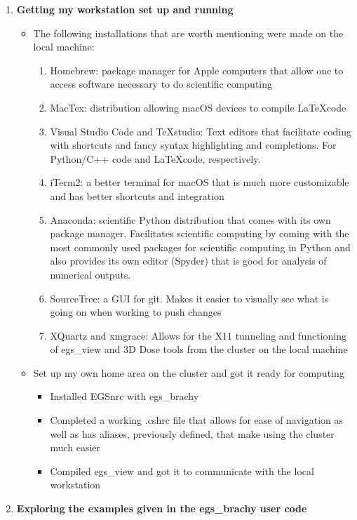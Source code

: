 \documentclass[12pt]{article}
\begin{document}
\begin{enumerate}
	\item \textbf{Getting my workstation set up and running}
	\begin{itemize}
		\item The following installations that are worth mentioning were made on the local machine:
		\begin{enumerate}
			\item Homebrew: package manager for Apple computers that allow one to access software necessary to do scientific computing
			\item MacTex: distribution allowing macOS devices to compile \LaTeX code
			\item Visual Studio Code and TeXstudio: Text editors that facilitate coding with shortcuts and fancy syntax highlighting and completions. For Python/C++ code and \LaTeX code, respectively.
			\item iTerm2: a better terminal for macOS that is much more customizable and has better shortcuts and integration
			\item Anaconda: scientific Python distribution that comes with its own package manager. Facilitates scientific computing by coming with the most commonly used packages for scientific computing in Python and also provides its own editor (Spyder) that is good for analysis of numerical outputs.
			\item SourceTree: a GUI for git. Makes it easier to visually see what is going on when working to push changes
			\item XQuartz and xmgrace: Allows for the X11 tunneling and functioning of egs\_view and 3D Dose tools from the cluster on the local machine
			\end{enumerate}
		\item Set up my own home area on the cluster and got it ready for computing
		\begin{itemize}
			\item Installed EGSnrc with egs\_brachy
			\item Completed a working .cshrc file that allows for ease of navigation as well as has aliases, previously defined, that make using the cluster much easier
			\item Compiled egs\_view and got it to communicate with the local workstation
		\end{itemize}
	\end{itemize}
	\item \textbf{Exploring the examples given in the egs\_brachy user code}

\end{enumerate}
\end{document}
